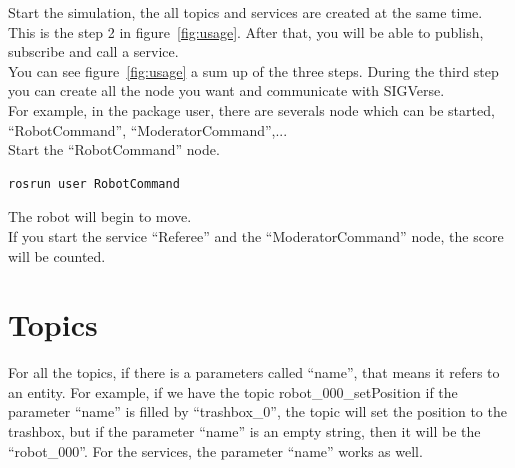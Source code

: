 \documentclass[notitlepage]{report}
\begin{document}
Start the simulation, the all topics and services are created at the same time. This is the step 2 in figure~\ref{fig:usage}. After that, you will be able to publish, subscribe and call a service.\\
You can see figure~\ref{fig:usage} a sum up of the three steps. During the third step you can create all the node you want and communicate with SIGVerse.\\
For example, in the package user, there are severals node which can be started, ``RobotCommand'', ``ModeratorCommand'',...\\
Start the ``RobotCommand'' node.
\begin{lstlisting}[language=bash]
rosrun user RobotCommand
\end{lstlisting}
The robot will begin to move.\\
If you start the service ``Referee'' and the ``ModeratorCommand'' node, the score will be counted.

\noindent\begin{minipage}{\linewidth}%
\label{fig:usage}  
\end{minipage}

\chapter{Topics}
For all the topics, if there is a parameters called ``name'', that means it refers to an entity. For example, if we have the topic robot\_000\_setPosition if the parameter ``name'' is filled by ``trashbox\_0'', the topic will set the position to the trashbox, but if the parameter ``name'' is an empty string, then it will be the ``robot\_000''. For the services, the parameter ``name'' works as well.\\
\end{document}
